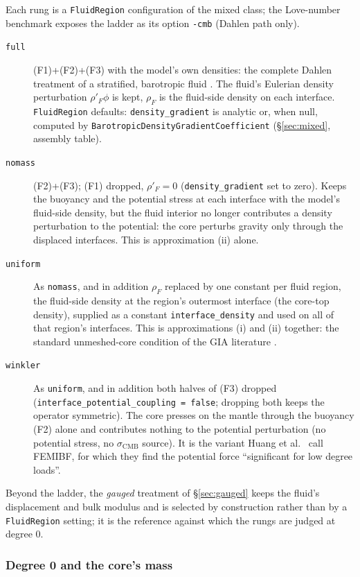 \documentclass[11pt]{article}
\numberwithin{equation}{section}
\theoremstyle{remark}
\newcommand{\code}[1]{\texttt{#1}}
\begin{document}
Each rung is a \code{FluidRegion} configuration of the mixed class; the
Love-number benchmark exposes the ladder as its option \code{-cmb}
(Dahlen path only).
\begin{description}
\item[\code{full}] (F1)+(F2)+(F3) with the model's own densities: the
  complete Dahlen treatment of a stratified, barotropic fluid
  \cite{Dahlen1974,AW10}. The fluid's Eulerian density perturbation
  $\rho'_F\phi$ is kept, $\rho_F$ is the fluid-side density on each
  interface. \code{FluidRegion} defaults: \code{density\_gradient} is
  analytic or, when null, computed by
  \code{BarotropicDensityGradientCoefficient} (\S\ref{sec:mixed}, assembly
  table).
\item[\code{nomass}] (F2)+(F3); (F1) dropped, $\rho'_F = 0$
  (\code{density\_gradient} set to zero). Keeps the buoyancy and the
  potential stress at each interface with the model's fluid-side density,
  but the fluid interior no longer contributes a density perturbation to
  the potential: the core perturbs gravity only through the displaced
  interfaces. This is approximation (ii) alone.
\item[\code{uniform}] As \code{nomass}, and in addition $\rho_F$ replaced
  by one constant per fluid region, the fluid-side density at the region's
  outermost interface (the core-top density), supplied as a constant
  \code{interface\_density} and used on all of that region's interfaces.
  This is approximations (i) and (ii) together: the standard unmeshed-core
  condition of the GIA literature
  \cite{Latychev2005,TrompMitrovica1999,AWahrZhong2013,Huang2023,
  CitcomSVE2025}.
\item[\code{winkler}] As \code{uniform}, and in addition both halves of
  (F3) dropped (\code{interface\_potential\_coupling = false}; dropping
  both keeps the operator symmetric). The core presses on the mantle
  through the buoyancy (F2) alone and contributes nothing to the potential
  perturbation (no potential stress, no $\sigma_{\mathrm{CMB}}$ source).
  It is the variant Huang et al.\ \cite{Huang2023} call FEMIBF, for which
  they find the potential force ``significant for low degree loads''.
\end{description}
Beyond the ladder, the \emph{gauged} treatment of \S\ref{sec:gauged}
keeps the fluid's displacement and bulk modulus and is selected by
construction rather than by a \code{FluidRegion} setting; it is the
reference against which the rungs are judged at degree 0.

\subsubsection{Degree 0 and the core's mass}
\label{sec:cmb-deg0}
\end{document}

